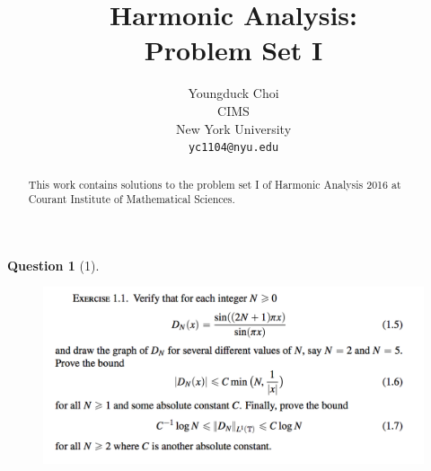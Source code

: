 \documentclass{article} %
\title{Harmonic Analysis:  \\
Problem Set I}
\author{
Youngduck Choi \\
CIMS \\
New York University\\
\texttt{yc1104@nyu.edu} \\
}
\theoremstyle{quest}
\newtheorem*{question}{Question}
\begin{document}
\maketitle

\begin{abstract}
This work contains solutions to the problem set I
of Harmonic Analysis 2016 at Courant Institute of Mathematical Sciences.
\end{abstract}

\begin{question}[1]
\hfill
\begin{figure}[h!]
  \centering
    \includegraphics[width=1\textwidth]{HA-1-1.png}
\end{figure}
\end{question}

\pagebreak
 
\end{document}
